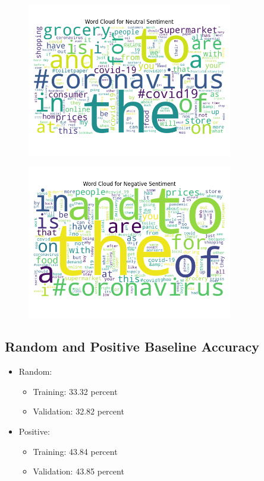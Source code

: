 \documentclass[12pt,a4paper]{article}
\begin{document}
\begin{figure}[H]
\centering
\includegraphics[width=0.8\textwidth]{Assignment 2/q1/wordcloud_Neutral.png}
\end{figure}

\begin{figure}[H]
\centering
\includegraphics[width=0.8\textwidth]{Assignment 2/q1/wordcloud_Negative.png}
\end{figure}


\subsection{Random and Positive Baseline Accuracy}
\begin{itemize}
    \item Random:
    \begin{itemize}
        \item Training: 33.32 percent
        \item Validation: 32.82 percent
    \end{itemize}

    \item Positive:
    \begin{itemize}
        \item Training: 43.84 percent
        \item Validation: 43.85 percent
    \end{itemize}
\end{itemize}
\end{document}
